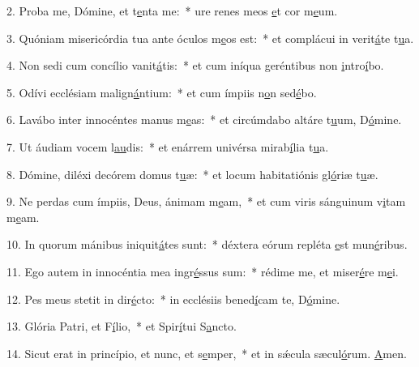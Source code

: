 2. Proba me, Dómine, et t\uline{e}nta me:~* ure renes meos \uline{e}t cor m\uline{e}um.\par 
3. Quóniam misericórdia tua ante óculos m\uline{e}os est:~* et complácui in verit\uline{á}te t\uline{u}a.\par 
4. Non sedi cum concílio vanit\uline{á}tis:~* et cum iníqua geréntibus non \uline{i}ntro\uline{í}bo.\par 
5. Odívi ecclésiam malign\uline{á}ntium:~* et cum ímpiis n\uline{o}n sed\uline{é}bo.\par 
6. Lavábo inter innocéntes manus m\uline{e}as:~* et circúmdabo altáre t\uline{u}um, D\uline{ó}mine.\par 
7. Ut áudiam vocem l\uline{au}dis:~* et enárrem univérsa mirab\uline{í}lia t\uline{u}a.\par 
8. Dómine, diléxi decórem domus t\uline{u}æ:~* et locum habitatiónis gl\uline{ó}riæ t\uline{u}æ.\par 
9. Ne perdas cum ímpiis, Deus, ánimam m\uline{e}am,~* et cum viris sánguinum v\uline{i}tam m\uline{e}am.\par 
10. In quorum mánibus iniquit\uline{á}tes sunt:~* déxtera eórum repléta \uline{e}st mun\uline{é}ribus.\par 
11. Ego autem in innocéntia mea ingr\uline{é}ssus sum:~* rédime me, et miser\uline{é}re m\uline{e}i.\par 
12. Pes meus stetit in dir\uline{é}cto:~* in ecclésiis bened\uline{í}cam te, D\uline{ó}mine.\par 
13. Glória Patri, et F\uline{í}lio,~* et Spir\uline{í}tui S\uline{a}ncto.\par 
14. Sicut erat in princípio, et nunc, et s\uline{e}mper,~* et in sǽcula sæcul\uline{ó}rum. \uline{A}men.\par 

